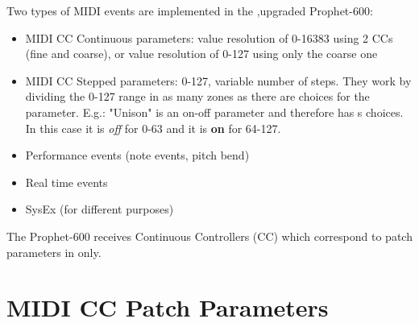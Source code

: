 Two types of MIDI events are implemented in the ,upgraded Prophet-600:

\begin{itemize}
  \setlength\itemsep{0cm}
  \item MIDI CC Continuous parameters: value resolution of 0-16383 using 2 CCs (fine and coarse), or value resolution of 0-127 using only the coarse one
  \item MIDI CC Stepped parameters: 0-127, variable number of steps. They work by dividing the 0-127 range in as many zones as there are choices for the parameter. E.g.: "Unison" is an on-off parameter and therefore has s choices. In this case it is \textit{off} for 0-63 and it is \textbf{on} for 64-127.
  \item Performance events (note events, pitch bend)
  \item Real time events
  \item SysEx (for different purposes)
\end{itemize}

The Prophet-600 receives Continuous Controllers (CC) which correspond to patch parameters in \presetmode only. 

\section{MIDI CC Patch Parameters} 

\footnotesize
\renewcommand{\arraystretch}{1.3}


